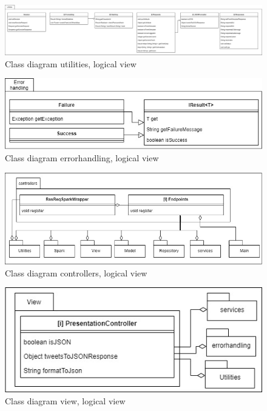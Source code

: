 \begin{figure}[H]
    \centering
    \includegraphics[width=1.0\textwidth]{images/class_diagram_utilities.jpg}
    \caption{Class diagram utilities, logical view}
    \label{fig:classDiagramUtilities}
\end{figure}
\begin{figure}[H]
    \centering
    \includegraphics[width=1.0\textwidth]{images/class_diagram_errorhandling.jpg}
    \caption{Class diagram errorhandling, logical view}
    \label{fig:classDiagramErrorhandling}
\end{figure}
\begin{figure}[H]
    \centering
    \includegraphics[width=1.0\textwidth]{images/class_diagram_controllers.jpg}
    \caption{Class diagram controllers, logical view}
    \label{fig:classDiagramControllers}
\end{figure}

\begin{figure}[H]
    \centering
    \includegraphics[width=1.0\textwidth]{images/class_diagram_view.jpg}
    \caption{Class diagram view, logical view}
    \label{fig:classDiagramView}
\end{figure}

